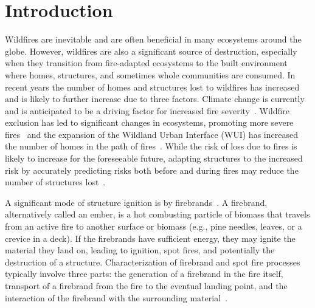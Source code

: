 
\chapter{Introduction}
\label{chap:intro}
 Wildfires are inevitable and are often beneficial in many ecosystems around the globe. However, wildfires are also a significant source of destruction, especially when they transition from fire-adapted ecosystems to the built environment where homes, structures, and sometimes whole communities are consumed. In recent years the number of homes and structures lost to wildfires has increased and is likely to further increase due to three factors. Climate change is currently and is anticipated to be a driving factor for increased fire severity~\cite{Levin2021Unveiling2019/2020}. Wildfire exclusion has led to significant changes in ecosystems, promoting more severe fires~\cite{Marlon2012Long-termUSA, Keeley2019} and the expansion of the Wildland Urban Interface (WUI) has increased the number of homes in the path of fires~\cite{Radeloff2018RapidRisk, Hammer2009DemographicManagement, }. While the risk of loss due to fires is likely to increase for the foreseeable future, adapting structures to the increased risk by accurately predicting risks both before and during fires may reduce the number of structures lost~\cite{Manzello2021}. 
    
   A significant mode of structure ignition is by firebrands~\cite{Manzello2020}. A firebrand, alternatively called an ember, is a hot combusting particle of biomass that travels from an active fire to another surface or biomass (e.g., pine needles, leaves, or a crevice in a deck). If the firebrands have sufficient energy, they may ignite the material they land on, leading to ignition, spot fires, and potentially the destruction of a structure. Characterization of firebrand and spot fire processes typically involve three parts: the generation of a firebrand in the fire itself, transport of a firebrand from the fire to the eventual landing point, and the interaction of the firebrand with the surrounding material~\cite{Babrauskas2003}. 
    

